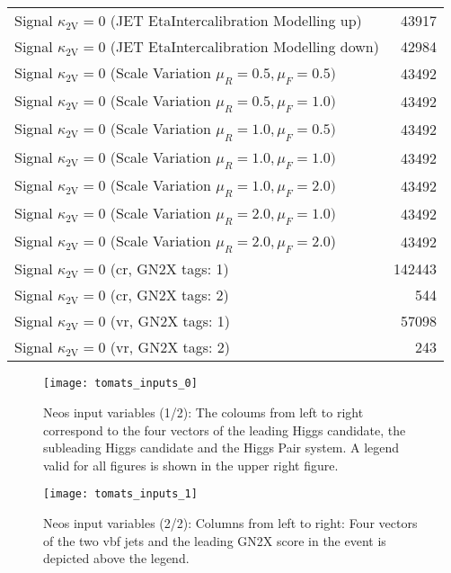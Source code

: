 \begin{table}[]
\begin{tabular}{lr}
        Signal $\kappa_\mathrm{2V}=0$ (JET EtaIntercalibration Modelling up)           & 43917  \\
        Signal $\kappa_\mathrm{2V}=0$ (JET EtaIntercalibration Modelling down)         & 42984  \\
        Signal $\kappa_\mathrm{2V}=0$ (Scale Variation $\mu_R = 0.5, \mu_F=0.5)$       & 43492  \\
        Signal $\kappa_\mathrm{2V}=0$ (Scale Variation $\mu_R = 0.5, \mu_F=1.0)$       & 43492  \\
        Signal $\kappa_\mathrm{2V}=0$ (Scale Variation $\mu_R = 1.0, \mu_F=0.5)$       & 43492  \\
        Signal $\kappa_\mathrm{2V}=0$ (Scale Variation $\mu_R = 1.0, \mu_F=1.0)$       & 43492  \\
        Signal $\kappa_\mathrm{2V}=0$ (Scale Variation $\mu_R = 1.0, \mu_F=2.0)$       & 43492  \\
        Signal $\kappa_\mathrm{2V}=0$ (Scale Variation $\mu_R = 2.0, \mu_F=1.0)$       & 43492  \\
        Signal $\kappa_\mathrm{2V}=0$ (Scale Variation $\mu_R = 2.0, \mu_F=2.0$)       & 43492  \\ \hline
        Signal $\kappa_\mathrm{2V}=0$ (\ac{cr}, GN2X tags: 1)                          & 142443 \\
        Signal $\kappa_\mathrm{2V}=0$ (\ac{cr}, GN2X tags: 2)                          & 544    \\
        Signal $\kappa_\mathrm{2V}=0$ (\ac{vr}, GN2X tags: 1)                          & 57098  \\
        Signal $\kappa_\mathrm{2V}=0$ (\ac{vr}, GN2X tags: 2)                          & 243    \\
    \end{tabular}
    \label{tab:neos-samples}
\end{table}


\begin{figure}
    \centering
    \texttt{[image: tomats\_inputs\_0]}
    \caption[]{Neos input variables (1/2): The coloums from left to right correspond to the four vectors of the leading Higgs candidate, the subleading Higgs candidate and the Higgs Pair system. A legend valid for all figures is shown in the upper right figure.}
    \label{fig:tomats_inputs_0}
\end{figure}



\begin{figure}
    \centering
    \texttt{[image: tomats\_inputs\_1]}
    \caption[]{Neos input variables (2/2): Columns from left to right: Four vectors of the two vbf jets and the leading GN2X score in the event is depicted above the legend.}
    \label{fig:tomats_inputs_1}
\end{figure}
